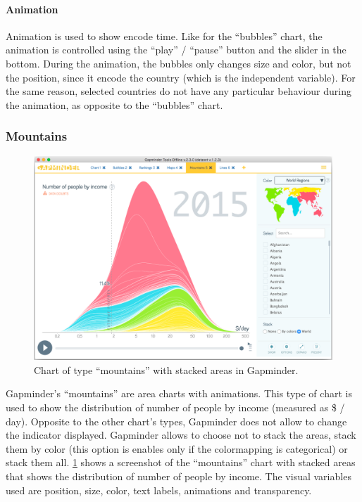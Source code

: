 \paragraph{Animation}
Animation is used to show encode time.
Like for the ``bubbles'' chart, the animation is controlled using the ``play'' / ``pause'' button and the slider in the bottom.
During the animation, the bubbles only changes size and color, but not the position, since it encode the country (which is the independent variable).
For the same reason, selected countries do not have any particular behaviour during the animation, as opposite to the ``bubbles'' chart.


\subsubsection{Mountains}
\label{subsubsec:mountains}
\begin{figure}[h]
	\centering
	\includegraphics[width=0.95\columnwidth]{figures/mountains}
	\caption{Chart of type ``mountains'' with stacked areas in Gapminder.}
	\label{fig:mountains}
\end{figure}

Gapminder's ``mountains'' are area charts with animations.
This type of chart is used to show the distribution of number of people by income (measured as \$ / day).
Opposite to the other chart's types, Gapminder does not allow to change the indicator displayed.
Gapminder allows to choose not to stack the areas, stack them by color (this option is enables only if the colormapping is categorical) or stack them all.
\cref{fig:mountains} shows a screenshot of the ``mountains'' chart with stacked areas that shows the distribution of number of people by income.
The visual variables used are position, size, color, text labels, animations and transparency.

